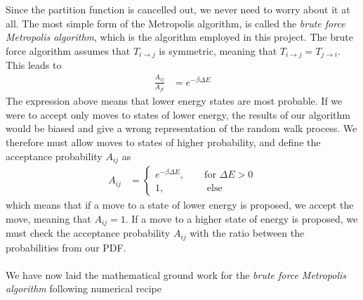 Since the partition function is cancelled out, we never need to worry about it at all. The most simple form of the Metropolis algorithm, is called the \textit{brute force Metropolis algorithm}, which is the algorithm employed in this project. The brute force algorithm assumes that $T_{i\rightarrow j}$ is symmetric, meaning that $T_{i\rightarrow j} = T_{j\rightarrow i}$. This leads to
\begin{align}
    \frac{A_{ij}}{A_{ji}} &= e^{-\beta\Delta E}
\end{align}
The expression above means that lower energy states are most probable. If we were to accept only moves to states of lower energy, the results of our algorithm would be biased and give a wrong representation of the random walk process. We therefore must allow moves to states of higher probability, and define the acceptance probability $A_{ij}$ as
\begin{align}
    A_{ij} &=
    \begin{cases}
    e^{-\beta\Delta E}, \qquad \text{for }\Delta E > 0\\
    1, \qquad\qquad\,\, \text{else}
    \end{cases}\label{cases}
\end{align}
which means that if a move to a state of lower energy is proposed, we accept the move, meaning that $A_{ij} = 1$. If a move to a higher state of energy is proposed, we must check the acceptance probability $A_{ij}$ with the ratio between the probabilities from our PDF. \\ \\
We have now laid the mathematical ground work for the \textit{brute force Metropolis algorithm} following numerical recipe\\

\\

